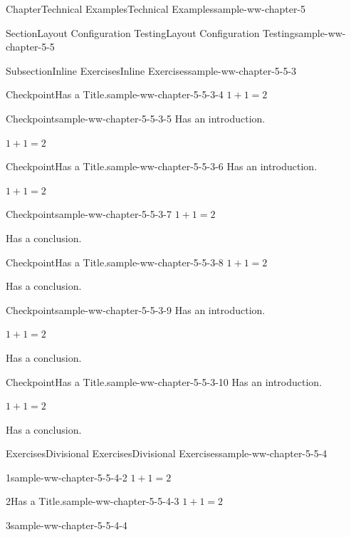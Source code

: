 \documentclass[oneside,10pt,]{book}
\numberwithin{equation}{section}
\begin{document}
\begin{chapterptx}{Chapter}{Technical Examples}{}{Technical Examples}{}{}{sample-ww-chapter-5}
\begin{sectionptx}{Section}{Layout Configuration Testing}{}{Layout Configuration Testing}{}{}{sample-ww-chapter-5-5}
\begin{subsectionptx}{Subsection}{Inline Exercises}{}{Inline Exercises}{}{}{sample-ww-chapter-5-5-3}
\begin{inlineexercise}{Checkpoint}{Has a Title.}{sample-ww-chapter-5-5-3-4}%
\(1+1=2\)%
\end{inlineexercise}%
\begin{inlineexercise}{Checkpoint}{}{sample-ww-chapter-5-5-3-5}%
Has an introduction.%
\par
\(1+1=2\)%
\end{inlineexercise}%
\begin{inlineexercise}{Checkpoint}{Has a Title.}{sample-ww-chapter-5-5-3-6}%
Has an introduction.%
\par
\(1+1=2\)%
\end{inlineexercise}%
\begin{inlineexercise}{Checkpoint}{}{sample-ww-chapter-5-5-3-7}%
\(1+1=2\)%
\par
Has a conclusion.%
\end{inlineexercise}%
\begin{inlineexercise}{Checkpoint}{Has a Title.}{sample-ww-chapter-5-5-3-8}%
\(1+1=2\)%
\par
Has a conclusion.%
\end{inlineexercise}%
\begin{inlineexercise}{Checkpoint}{}{sample-ww-chapter-5-5-3-9}%
Has an introduction.%
\par
\(1+1=2\)%
\par
Has a conclusion.%
\end{inlineexercise}%
\begin{inlineexercise}{Checkpoint}{Has a Title.}{sample-ww-chapter-5-5-3-10}%
Has an introduction.%
\par
\(1+1=2\)%
\par
Has a conclusion.%
\end{inlineexercise}%
\end{subsectionptx}
%
%
\typeout{************************************************}
\typeout{************************************************}
%
\begin{exercises-subsection}{Exercises}{Divisional Exercises}{}{Divisional Exercises}{}{}{sample-ww-chapter-5-5-4}
\begin{divisionexercise}{1}{}{}{sample-ww-chapter-5-5-4-2}%
\(1+1=2\)%
\end{divisionexercise}%
\begin{divisionexercise}{2}{Has a Title.}{}{sample-ww-chapter-5-5-4-3}%
\(1+1=2\)%
\end{divisionexercise}%
\begin{divisionexercise}{3}{}{}{sample-ww-chapter-5-5-4-4}%

\end{divisionexercise}
\end{exercises-subsection}
\end{sectionptx}
\end{chapterptx}
\end{document}
